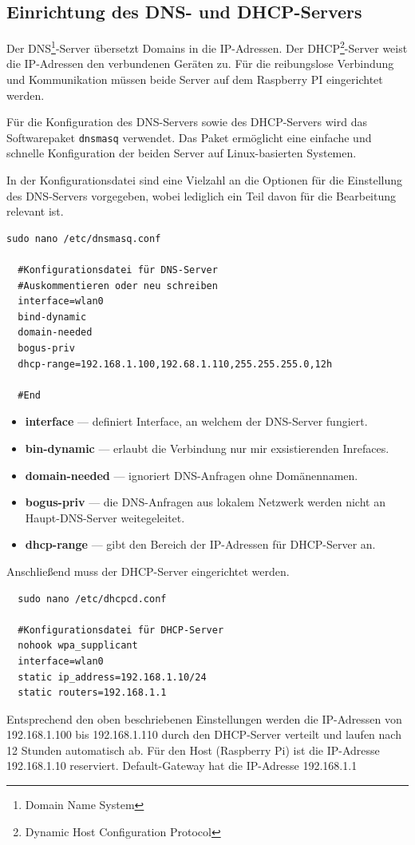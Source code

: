 \documentclass[12pt, letterpaper]{article}
\begin{document}
\subsection{Einrichtung des DNS- und DHCP-Servers}
\par Der DNS\footnote[2]{Domain Name System}-Server übersetzt Domains in die IP-Adressen. Der DHCP\footnote[3]{Dynamic Host Configuration Protocol}-Server weist die IP-Adressen den verbundenen Geräten zu. Für die reibungslose Verbindung und Kommunikation müssen beide Server auf dem Raspberry PI eingerichtet werden.
\par Für die Konfiguration des DNS-Servers sowie des DHCP-Servers wird das Softwarepaket \texttt{dnsmasq} verwendet. Das Paket ermöglicht eine einfache und schnelle Konfiguration der beiden Server auf Linux-basierten Systemen.
\par In der Konfigurationsdatei sind eine Vielzahl an die Optionen für die Einstellung des DNS-Servers vorgegeben, wobei lediglich ein Teil davon für die Bearbeitung relevant ist.
\begin{Verbatim}[frame=single]
  sudo nano /etc/dnsmasq.conf

  #Konfigurationsdatei für DNS-Server
  #Auskommentieren oder neu schreiben
  interface=wlan0
  bind-dynamic
  domain-needed
  bogus-priv
  dhcp-range=192.168.1.100,192.68.1.110,255.255.255.0,12h

  #End
\end{Verbatim}
\begin{itemize}
  \item[\textbullet] \textbf{interface} --- definiert Interface, an welchem der DNS-Server fungiert.
  \item[\textbullet] \textbf{bin-dynamic} --- erlaubt die Verbindung nur mir exsistierenden Inrefaces.
  \item[\textbullet] \textbf{domain-needed} --- ignoriert DNS-Anfragen ohne Domänennamen. 
  \item[\textbullet] \textbf{bogus-priv} --- die DNS-Anfragen aus lokalem Netzwerk werden nicht an Haupt-DNS-Server weitegeleitet.
  \item[\textbullet] \textbf{dhcp-range} --- gibt den Bereich der IP-Adressen für DHCP-Server an.
\end{itemize}
\par Anschließend muss der DHCP-Server eingerichtet werden.
\begin{Verbatim}
  sudo nano /etc/dhcpcd.conf

  #Konfigurationsdatei für DHCP-Server
  nohook wpa_supplicant
  interface=wlan0
  static ip_address=192.168.1.10/24
  static routers=192.168.1.1
\end{Verbatim}
\par Entsprechend den oben beschriebenen Einstellungen werden die IP-Adressen von 192.168.1.100 bis 192.168.1.110 durch den DHCP-Server verteilt und laufen nach 12 Stunden automatisch ab. Für den Host (Raspberry Pi) ist die IP-Adresse 192.168.1.10 reserviert. Default-Gateway hat die IP-Adresse 192.168.1.1 
\end{document}
